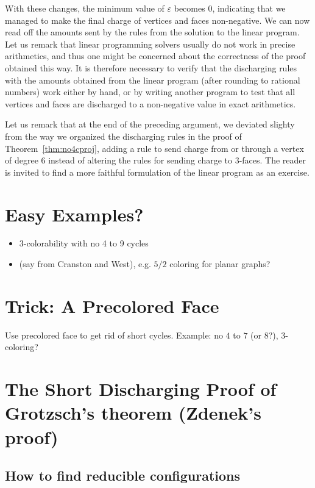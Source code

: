 \documentclass[12pt,twoside,openright,a4paper]{book}
\begin{document}
With these changes, the minimum value of $\varepsilon$ becomes $0$, indicating that we managed to make the final charge
of vertices and faces non-negative.  We can now read off the amounts sent by the rules from the solution to the linear program.
Let us remark that linear programming solvers usually do not work in precise arithmetics, and thus one might be concerned
about the correctness of the proof obtained this way.  It is therefore necessary to verify that the discharging rules with
the amounts obtained from the linear program (after rounding to rational numbers) work either by hand, or by writing another program
to test that all vertices and faces are discharged to a non-negative value in exact arithmetics.

Let us remark that at the end of the preceding argument, we deviated slighty from the way we organized the discharging rules
in the proof of Theorem~\ref{thm:no4cproj}, adding a rule to send charge from or through a vertex of degree 6 instead of altering
the rules for sending charge to $3$-faces.  The reader is invited to find a more faithful formulation of the linear program
as an exercise.

\section{Easy Examples?}

\begin{itemize}
\item $3$-colorability with no 4 to 9 cycles
\item (say from Cranston and West), e.g. $5/2$ coloring for planar graphs?
\end{itemize}

\section{Trick: A Precolored Face}

Use precolored face to get rid of short cycles. Example: no $4$ to $7$ (or $8$?), $3$-coloring?
 
\section{The Short Discharging Proof of Grotzsch's theorem (Zdenek's proof)}

\subsection{How to find reducible configurations}\label{ssec:howto-redu}
\end{document}

